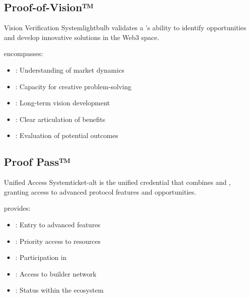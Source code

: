 \subsection{Proof-of-Vision™}

\begin{mfai-box-build}{Vision Verification System}{lightbulb}
 validates a 's ability to identify opportunities and develop innovative solutions in the Web3 space.
\end{mfai-box-build}

 encompasses:

\begin{itemize}[leftmargin=*]
\item {}: Understanding of market dynamics
\item {}: Capacity for creative problem-solving
\item {}: Long-term vision development
\item {}: Clear articulation of benefits
\item {}: Evaluation of potential outcomes
\end{itemize}

\subsection{Proof Pass™}

\begin{mfai-box-prove}{Unified Access System}{ticket-alt}
 is the unified credential that combines  and , granting access to advanced protocol features and opportunities.
\end{mfai-box-prove}

 provides:

\begin{itemize}[leftmargin=*]
\item {}: Entry to advanced features
\item {}: Priority access to resources
\item {}: Participation in 
\item {}: Access to builder network
\item {}: Status within the ecosystem
\end{itemize}


